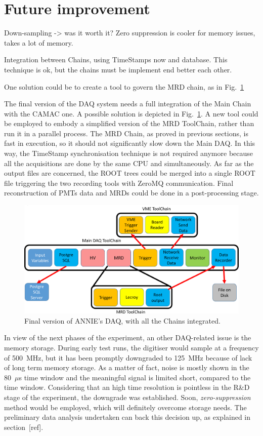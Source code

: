 \section{Future improvement}
\label{sec:3.3}
{
\color{red}
Down-sampling -> was it worth it?
Zero suppression is cooler for memory issues, takes a lot of memory.

Integration between Chains, using TimeStamps now and database.
This technique is ok, but the chains must be implement end better each other.

One solution could be to create a tool to govern the MRD chain, as in Fig.~\ref{fig:daqcomplete}
}

The final version of the DAQ system needs a full integration of the Main Chain with the %
CAMAC one.
A possible solution is depicted in Fig.~\ref{fig:daqcomplete}.
A new tool could be employed to embody a simplified version of the MRD ToolChain, rather than %
run it in a parallel process.
The MRD Chain, as proved in previous sections, is fast in execution, so it should not %
significantly slow down the Main DAQ.
In this way, the TimeStamp synchronisation technique is not required anymore because all the %
acquisitions are done by the same CPU and simultaneously.
As far as the output files are concerned, the ROOT trees could be merged into a single ROOT file %
triggering the two recording tools with ZeroMQ communication.
Final reconstruction of PMTs data and MRDs could be done in a post-processing stage.

\begin{figure}[]
  \centering
  \includegraphics[scale=0.17]{pics/pag5richardshkmeeting}
  \caption{Final version of ANNIE's DAQ, with all the Chains integrated.}
  \label{fig:daqcomplete}
\end{figure}

In view of the next phases of the experiment, an other DAQ-related issue is the memory storage.
During early test runs, the digitiser would sample at a frequency of 500~MHz, but it has been %
promptly downgraded to 125~MHz because of lack of long term memory storage.
As a matter of fact, noise is mostly shown in the 80~$\mu$s time window and %
the meaningful signal is limited short, compared to the time window.
Considering that an high time resolution is pointless in the R\&D stage of the experiment, the %
downgrade was established.
Soon, \emph{zero-suppression} method would be employed, which will definitely overcome storage needs.
The preliminary data analysis undertaken can back this decision up, as explained in section~[ref].
